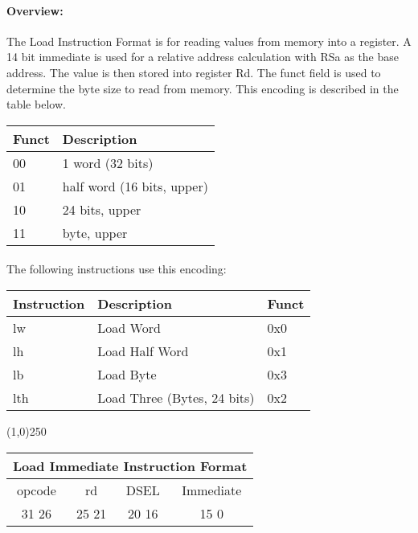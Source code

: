 \documentclass[letterpaper, 11pt]{article}
\begin{document}
\paragraph{Overview:}The Load Instruction Format is for reading values from memory into a register. A 14 bit immediate is used
for a relative address calculation with RSa as the base address. The value is then stored into register Rd. The funct field is used
to determine the byte size to read from memory. This encoding is described in the table below. \\
\begin{tabular}{l|l}
		Funct & Description \\ \hline
		00	  & 1 word (32 bits) \\
		01	  & half word (16 bits, upper) \\ 
		10	  & 24 bits, upper \\
		11	  & byte, upper		\\
		\end{tabular}
\paragraph{}The following instructions use this encoding: \\
\begin{center}
	\begin{tabular}{|l|l|l|} \hline
			Instruction & Description 						& Funct\\ \hline
			lw			& Load Word							& 0x0 \\ \hline
			lh			& Load Half Word					& 0x1 \\ \hline
			lb			& Load Byte							& 0x3 \\ \hline
			lth			& Load Three (Bytes, 24 bits)		& 0x2 \\ \hline

\end{tabular}
\end{center}
\begin{center}
	\line(1,0){250}
\end{center}

\begin{center}
		\begin{tabular}{|c|c|c|c|}
				\multicolumn{4}{c}{Load Immediate Instruction Format}\\ \hline
				\hspace{2pt} opcode \hspace{2pt} & \hspace{5pt} rd \hspace{5pt} &  \hspace{4pt} DSEL \hspace{4pt} & \hspace{10pt}Immediate  \hspace{10pt}   \\	\hline
			31 \hfill 26& 25 \hfill 21 &20 \hfill  16& 15  \hfill   0\\ \hline
		
	\end{tabular}
\end{center}
\end{document}
